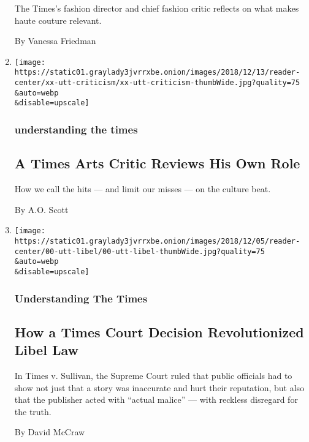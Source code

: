 \begin{enumerate}
  The Times's fashion director and chief fashion critic reflects on what
  makes haute couture relevant.

  By Vanessa Friedman
\item
  \href{/2018/12/11/reader-center/arts-criticism-explainer.html}{}

  \texttt{[image: https://static01.graylady3jvrrxbe.onion/images/2018/12/13/reader-center/xx-utt-criticism/xx-utt-criticism-thumbWide.jpg?quality=75\\\&auto=webp\\\&disable=upscale]}

  \hypertarget{understanding-the-times-10}{%
  \subsubsection{understanding the
  times}\label{understanding-the-times-10}}

  \hypertarget{a-times-arts-critic-reviews-his-own-role}{%
  \subsection{A Times Arts Critic Reviews His Own
  Role}\label{a-times-arts-critic-reviews-his-own-role}}

  How we call the hits --- and limit our misses --- on the culture beat.

  By A.O. Scott
\item
  \href{/2018/11/30/reader-center/libel-law-explainer.html}{}

  \texttt{[image: https://static01.graylady3jvrrxbe.onion/images/2018/12/05/reader-center/00-utt-libel/00-utt-libel-thumbWide.jpg?quality=75\\\&auto=webp\\\&disable=upscale]}

  \hypertarget{understanding-the-times-11}{%
  \subsubsection{Understanding The
  Times}\label{understanding-the-times-11}}

  \hypertarget{how-a-times-court-decision-revolutionized-libel-law}{%
  \subsection{How a Times Court Decision Revolutionized Libel
  Law}\label{how-a-times-court-decision-revolutionized-libel-law}}

  In Times v. Sullivan, the Supreme Court ruled that public officials
  had to show not just that a story was inaccurate and hurt their
  reputation, but also that the publisher acted with ``actual malice''
  --- with reckless disregard for the truth.

  By David McCraw
\end{enumerate}

